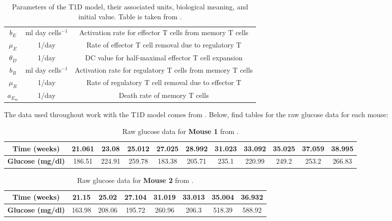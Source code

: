 \begin{appendices}
\begin{table}[H]
\begin{tabular}{c|c|c}
            $b_E$ & ml day cells$^{-1}$ & Activation rate for effector T cells from memory T cells\\
            $\mu_E$ & 1/day & Rate of effector T cell removal due to regulatory T\\
            $\theta_D$ & 1/day & DC value for half-maximal effector T cell expansion\\
            $b_R$ & ml day cells$^{-1}$  & Activation rate for regulatory T cells from memory T cells\\
            $\mu_R$ & 1/day & Rate of regulatory T cell removal due to effector T\\
            $a_{E_m}$ & 1/day & Death rate of memory T cells\\
            
            
        \end{tabular}
    \caption{Parameters of the T1D model, their associated units, biological meaning, and initial value. Table is taken from \cite{shtylla2019mathematical}.}
    \label{table:ParameterNotationAppendix} 
\end{table}

The data used throughout work with the T1D model comes from \cite{Lietal2009}. Below, find tables for the raw glucose data for each mouse:

\begin{table}[H]
\centering
  \begin{center} 
    \begin{tabular} {c|c|c|c|c|c|c|c|c|c|c}%
    \cline{1-11}
      \textbf{Time (weeks)} & 21.061 & 23.08 & 25.012 & 27.025 & 28.992 & 31.023 & 33.092 & 35.025 & 37.059 & 38.995 \\
      \hline
      \textbf{Glucose (mg/dl)} & 186.51 & 224.91 & 259.78 & 183.38 & 205.71 & 235.1 & 220.99 & 249.2 & 253.2 & 266.83\\
      \hline
    \end{tabular}
    \caption{Raw glucose data for \textbf{Mouse 1} from \cite{Lietal2009}.}
    \label{table:Li_Mouse1}
  \end{center}
\end{table}

\begin{table}[H]
\centering
  \begin{center} 
    \begin{tabular} {c|c|c|c|c|c|c|c}%
    \cline{1-8}
      \textbf{Time (weeks)} & 21.15 & 25.02 & 27.104 & 31.019 & 33.013 & 35.004 & 36.932\\
      \hline
      \textbf{Glucose (mg/dl)} & 163.98 & 208.06 & 195.72 & 260.96 & 206.3 & 518.39 & 588.92\\
      \hline
    \end{tabular}
    \caption{Raw glucose data for \textbf{Mouse 2} from \cite{Lietal2009}.}
    \label{table:Li_Mouse2}
  \end{center}
\end{table}


\end{appendices}
